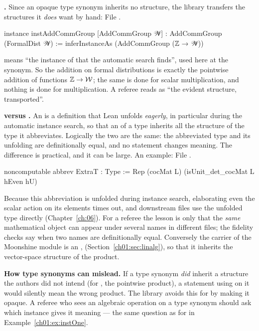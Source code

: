 \textbf{.} Since an opaque type synonym inherits no structure, the library
transfers the structures it \emph{does} want by hand:
\noindent File .
\begin{leancode}
instance instAddCommGroup [AddCommGroup 𝒲] : AddCommGroup (FormalDist 𝒲) :=
  inferInstanceAs (AddCommGroup (ℤ → 𝒲))
\end{leancode}
 means ``the instance of  that the automatic search finds'', used
here at the synonym. So the addition on formal distributions is exactly the pointwise addition of
functions ${\mathbb{Z}}\to\mathcal W$; the same is done for scalar multiplication, and nothing is done for
multiplication. A referee reads  as ``the evident structure, transported''.

\textbf{ versus .} An  is a definition that Lean unfolds
\emph{eagerly}, in particular during the automatic instance search, so that an  of a
type inherits all the structure of the type it abbreviates. Logically the two are the same: the
abbreviated type and its unfolding are definitionally equal, and no statement changes meaning. The
difference is practical, and it can be large. An example:
\noindent File .
\begin{leancode}
noncomputable abbrev ExtraT : Type := Rep (cocMat L) (isUnit_det_cocMat L hEven hU)
\end{leancode}
Because this abbreviation is unfolded during instance search, elaborating even the scalar action
on its elements times out, and downstream files use the unfolded type 
directly (Chapter~\ref{ch:06}). For a referee the lesson is only that the \emph{same} mathematical
object can appear under several names in different files; the fidelity checks say when two names are
definitionally equal. Conversely the carrier of the Moonshine module is an ,
 (Section~\ref{ch01:sec:linalg}), so that it inherits the
vector-space structure of the product.

\begin{warning}
\textbf{How type synonyms can mislead.} If a type synonym \emph{did} inherit a structure the
authors did not intend (for , the pointwise product), a statement using \lean{*} on
it would silently mean the wrong product. The library avoids this for  by making it
opaque. A referee who sees an algebraic operation on a type synonym should ask which instance gives
it meaning --- the same question as for  in Example~\ref{ch01:ex:instOne}.
\end{warning}

